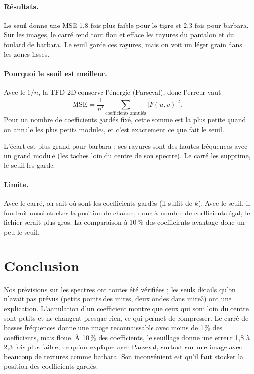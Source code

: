 \documentclass[11pt,a4paper]{article}
\begin{document}
\paragraph{Résultats.} Le seuil donne une MSE 1,8 fois plus faible pour le tigre et
2,3 fois pour barbara. Sur les images, le carré rend tout flou et efface les rayures
du pantalon et du foulard de barbara. Le seuil garde ces rayures, mais on voit un
léger grain dans les zones lisses.

\paragraph{Pourquoi le seuil est meilleur.} Avec le $1/n$, la TFD 2D conserve
l'énergie (Parseval), donc l'erreur vaut
\[
  \mathrm{MSE} = \frac{1}{n^2} \sum_{\text{coefficients annulés}} |F(u,v)|^2 .
\]
Pour un nombre de coefficients gardés fixé, cette somme est la plus petite
quand on annule les plus petits modules, et c'est exactement ce que fait le seuil.

L'écart est plus grand pour barbara : ses rayures sont des hautes fréquences avec un
grand module (les taches loin du centre de son spectre). Le carré les supprime, le
seuil les garde.

\paragraph{Limite.} Avec le carré, on sait où sont les coefficients gardés (il suffit
de $k$). Avec le seuil, il faudrait aussi stocker la position de chacun, donc à nombre
de coefficients égal, le fichier serait plus gros. La comparaison à 10\,\% des
coefficients avantage donc un peu le seuil.

\section{Conclusion}

Nos prévisions sur les spectres ont toutes été vérifiées ; les seuls détails qu'on
n'avait pas prévus (petits points des mires, deux ondes dans mire3) ont une
explication. L'annulation d'un coefficient montre que ceux qui sont loin du centre
sont petits et ne changent presque rien, ce qui permet de compresser. Le carré de basses fréquences donne une image reconnaissable
avec moins de 1\,\% des coefficients, mais floue. À 10\,\% des coefficients, le
seuillage donne une erreur 1,8 à 2,3 fois plus faible, ce qu'on explique avec
Parseval, surtout sur une image avec beaucoup de textures comme barbara. Son
inconvénient est qu'il faut stocker la position des coefficients gardés.
\end{document}

